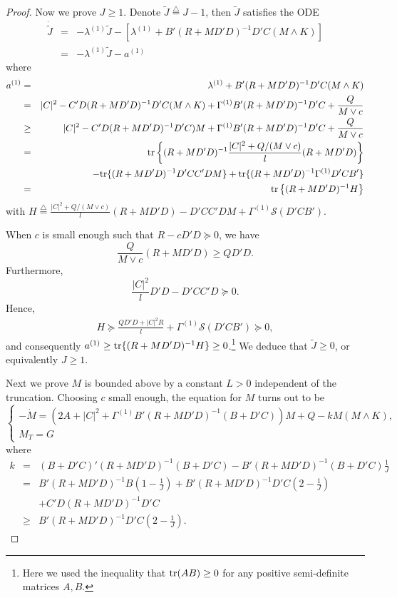 \documentclass[final]{siamltex}
\begin{document}
\begin{proof}
Now we prove $J\ge 1$. Denote $\tilde J{\stackrel{\triangle}{=}} J-1$, then $\tilde J$ satisfies the ODE
\begin{eqnarray*}
\dot{\tilde J}&=&-\lambda^{(1)}\tilde J-\left[ \lambda^{(1)}+B'(R+MD'D)^{-1}D'C(M\wedge K)\right] \\
&=&-\lambda^{(1)}\tilde J-a^{(1)}
\end{eqnarray*}
where
\begin{eqnarray*}
a^{(1)}&=&\lambda^{(1)}+B'(R+MD'D)^{-1}D'C(M\wedge K)\\
&=&|C|^2-C'D(R+MD'D)^{-1}D'C(M\wedge K)+ \Gamma^{(1)}B'(R+MD'D)^{-1}D'C+\frac{Q}{M\vee c}\\
&\ge &|C|^2-C'D(R+MD'D)^{-1}D'C)M+ \Gamma^{(1)}B'(R+MD'D)^{-1}D'C+\frac{Q}{M\vee c}\\
&=&{{\rm tr}} \left\{(R+MD'D)^{-1}\frac{|C|^2+Q/(M\vee c)}{l}(R+MD'D)\right\}\\
&&      -{{\rm tr}}\{(R+MD'D)^{-1}D'CC'DM\}+{{\rm tr}}\{(R+MD'D)^{-1}\Gamma^{(1)}D'CB'\}\\
 &=&{{\rm tr}}\left\{(R+MD'D)^{-1}H \right\}
\end{eqnarray*}
with $H{\stackrel{\triangle}{=}}\frac{|C|^2+Q/(M\vee c)}{l}(R+MD'D)-D'CC'DM+\Gamma^{(1)}{{\mathcal S}}(D'CB' ) $.

When $c$ is small enough such that 
$R-cD'D\succeq 0$, we have
$$\frac{Q}{M\vee c}(R+MD'D)\ge QD'D.$$
Furthermore,
$$\frac{|C|^2}{l}D'D-D'CC'D\succeq 0.$$
Hence,
\begin{eqnarray*}
H\succeq \frac{QD'D+|C|^2R}{l}+\Gamma^{(1)}{{\mathcal S}}(D'CB')\succeq 0,
\end{eqnarray*}
and consequently $a^{(1)}\ge {{\rm tr}}\{(R+MD'D)^{-1}H\} \ge 0$.\footnote{Here we used the inequality that ${{\rm tr}}(AB)\ge 0$ for any  positive semi-definite matrices $A,B$.} We deduce that $\tilde J\ge 0$,
or equivalently $J\ge 1$.

Next we prove $M$ is bounded above by a constant $L>0$ independent of the truncation.
Choosing $c$ small enough,  the equation for $M$ turns out to be
$$ \left\{\begin{array}{l}
-\dot{M}= \left(2A+|C|^2+\Gamma^{(1)} B'(R+MD'D)^{-1}(B+D'C)\right)M+Q-k M(M\wedge K),\\
M_T=G
\end{array}\right.
$$
where
\begin{eqnarray*}
k&=&(B+D'C)'(R+MD'D)^{-1}(B+D'C)-B'(R+MD'D)^{-1}(B+D'C)\frac{1}{J}\\
&=&B'(R+MD'D)^{-1}B\left(1-\frac{1}{J}\right)+B'(R+MD'D)^{-1}D'C\left(2-\frac{1}{J}\right)\\
&&+C'D(R+MD'D)^{-1}D'C\\
&\ge&B'(R+MD'D)^{-1}D'C\left(2-\frac{1}{J}\right).
\end{eqnarray*}


\end{proof}
\end{document}
